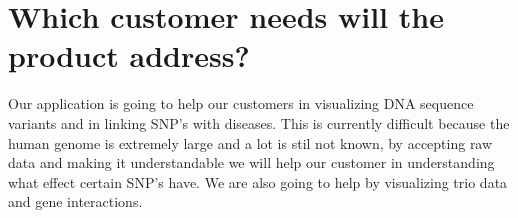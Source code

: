 \section{Which customer needs will the product address?}
Our application is going to help our customers in visualizing DNA sequence variants and in linking SNP's with diseases. This is currently difficult because the human genome is extremely large and a lot is stil not known, by accepting raw data and making it understandable we will help our customer in understanding what effect certain SNP's have. We are also going to help by visualizing trio data and gene interactions. 